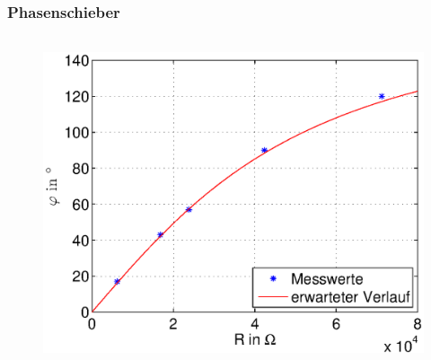 \begin{frame}
\frametitle{Phasenschieber}
\framesubtitle{}
    \begin{columns}[c]
        \begin{figure}[H]
        \begin{center}
                \includegraphics[scale=0.6]{./img/plots/Auf_1_a.eps}
        \end{center}
        \end{figure}
    \end{columns}
\end{frame}

